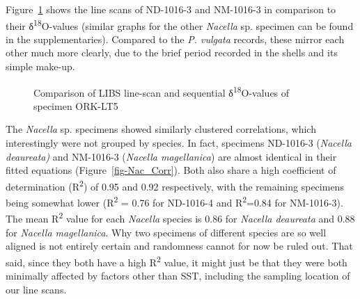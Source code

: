 \documentclass[
  authoryear,
  preprint,
  3p]{elsarticle}
\begin{document}
Figure~\ref{fig-Nac_Comp} shows the line scans of ND-1016-3 and
NM-1016-3 in comparison to their δ\textsuperscript{18}O-values (similar
graphs for the other \emph{Nacella} sp. specimen can be found in the
supplementaries). Compared to the \emph{P. vulgata} records, these
mirror each other much more clearly, due to the brief period recorded in
the shells and its simple make-up.

\begin{figure}


\caption{\label{fig-Nac_Comp}Comparison of LIBS line-scan and sequential
δ\textsuperscript{18}O-values of specimen ORK-LT5}

\end{figure}%

The \emph{Nacella} sp. specimens showed similarly clustered
correlations, which interestingly were not grouped by species. In fact,
specimens ND-1016-3 (\emph{Nacella deaureata)} and NM-1016-3
(\emph{Nacella magellanica}) are almost identical in their fitted
equations (Figure~\ref{fig-Nac_Corr}). Both also share a high
coefficient of determination (R\textsuperscript{2}) of 0.95 and 0.92
respectively, with the remaining specimens being somewhat lower
(R\textsuperscript{2} = 0.76 for ND-1016-4 and R\textsuperscript{2}=0.84
for NM-1016-3). The mean R\textsuperscript{2} value for each
\emph{Nacella} species is 0.86 for \emph{Nacella deaureata} and 0.88 for
\emph{Nacella magellanica}. Why two specimens of different species are
so well aligned is not entirely certain and randomness cannot for now be
ruled out. That said, since they both have a high R\textsuperscript{2}
value, it might just be that they were both minimally affected by
factors other than SST, including the sampling location of our line
scans.
\end{document}
